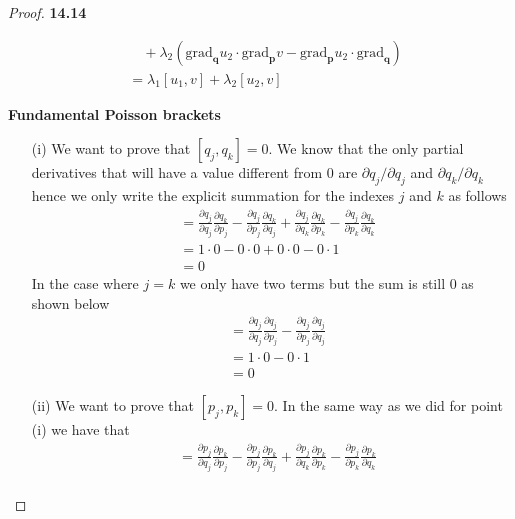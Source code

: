\documentclass[11pt]{article}
\newcommand{\ngrad}[1]{\text{grad}_{\bm{#1}}}
\theoremstyle{definition}
\begin{document}
\begin{proof}{\textbf{14.14}}
\begin{itemize}
\begin{align*}
                &\quad
                + \lambda_2 (\ngrad{q}u_2\cdot\ngrad{p}v
                - \ngrad{p}u_2\cdot \ngrad{q})\\
                &= \lambda_1[u_1, v] + \lambda_2[u_2,v]
        \end{align*}
    \end{itemize}
\cleardoublepage
    \textbf{Fundamental Poisson brackets}
    \begin{itemize}
        \item[(i)] We want to prove that $[q_j,q_k] = 0$.
        We know that the only partial derivatives that will have a value
        different from 0 are $\partial q_j/\partial q_j$ and $\partial q_k/\partial q_k$
        hence we only write the explicit summation for the indexes
        $j$ and $k$ as follows
        \begin{align*}
            [q_j,q_k] &= 
                \frac{\partial q_j}{\partial q_j}\frac{\partial q_k}{\partial p_j} -
                \frac{\partial q_j}{\partial p_j}\frac{\partial q_k}{\partial q_j}
                +
                \frac{\partial q_j}{\partial q_k}\frac{\partial q_k}{\partial p_k} -
                \frac{\partial q_j}{\partial p_k}\frac{\partial q_k}{\partial q_k}\\
            &= 1\cdot 0 - 0\cdot 0 + 0\cdot 0 - 0\cdot 1\\
            &= 0 
        \end{align*}
        In the case where $j=k$ we only have two terms but the sum is still 0
        as shown below 
        \begin{align*}
            [q_j,q_j] &= 
                \frac{\partial q_j}{\partial q_j}\frac{\partial q_j}{\partial p_j} -
               \frac{\partial q_j}{\partial p_j}\frac{\partial q_j}{\partial q_j}\\
            &= 1\cdot 0 - 0\cdot1\\
            &= 0 
        \end{align*}
        \item[(ii)] We want to prove that $[p_j, p_k] = 0$. In the same way
        as we did for point (i) we have that
        \begin{align*}
            [p_j,p_k] &= 
                \frac{\partial p_j}{\partial q_j}\frac{\partial p_k}{\partial p_j} -
                \frac{\partial p_j}{\partial p_j}\frac{\partial p_k}{\partial q_j}
                +
                \frac{\partial p_j}{\partial q_k}\frac{\partial p_k}{\partial p_k} -
                \frac{\partial p_j}{\partial p_k}\frac{\partial p_k}{\partial q_k}\\

\end{align*}
\end{itemize}
\end{proof}
\end{document}
